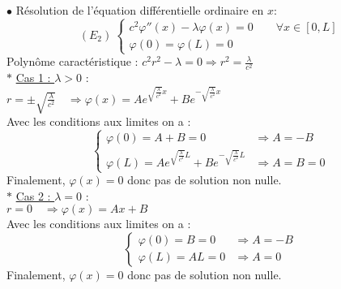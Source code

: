 \documentclass[12pt]{article}
\begin{document}
\noindent $\bullet$ Résolution de l'équation différentielle ordinaire en $x$:
\begin{equation*}
	(E_2) \
	\begin{cases}
		c^2 \varphi''(x)-\lambda \varphi (x)=0 \qquad \forall x \in [0,L] \\
		\varphi(0)=\varphi(L)=0
	\end{cases}
\end{equation*}
Polynôme caractéristique : $c^2 r^2-\lambda = 0 \Longrightarrow r^2 =\frac{\lambda}{c^2}$ \\

\noindent $\ast$ \underline{Cas 1 : $\lambda>0$} : \\
$r=\pm \sqrt{\frac{\lambda}{c^2}} \quad \Longrightarrow \varphi(x)=Ae^{\sqrt{\frac{\lambda}{c^2}}x}+Be^{-\sqrt{\frac{\lambda}{c^2}}x}$ \\
Avec les conditions aux limites on a :
\begin{equation*}
	\begin{cases}
		\varphi(0)=A+B=0 &\Longrightarrow A=-B \\
		\varphi(L)=Ae^{\sqrt{\frac{\lambda}{c^2}}L}+Be^{-\sqrt{\frac{\lambda}{c^2}}L} &\Longrightarrow A=B=0
	\end{cases}
\end{equation*}
Finalement, $\varphi(x)=0$ donc pas de solution non nulle. \\

\noindent $\ast$ \underline{Cas 2 : $\lambda=0$} : \\
$r=0 \quad \Longrightarrow \varphi(x)=Ax+B$ \\
Avec les conditions aux limites on a :
\begin{equation*}
	\begin{cases}
		\varphi(0)=B=0 &\Longrightarrow A=-B \\
		\varphi(L)=AL=0 &\Longrightarrow A=0
	\end{cases}
\end{equation*}
Finalement, $\varphi(x)=0$ donc pas de solution non nulle. \\
\end{document}

